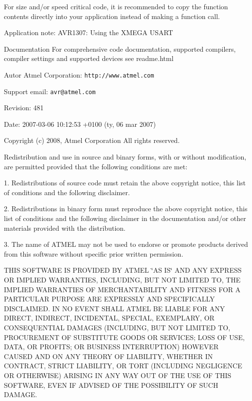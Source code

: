 For size and/or speed critical code, it is recommended to copy the function contents directly into your application instead of making a function call.

\begin{DoxyParagraph}{Application note:}
AVR1307: Using the XMEGA USART
\end{DoxyParagraph}
\begin{DoxyParagraph}{Documentation}
For comprehensive code documentation, supported compilers, compiler settings and supported devices see readme.html
\end{DoxyParagraph}
\begin{DoxyAuthor}{Autor}
Atmel Corporation: {\tt http://www.atmel.com} \par
 Support email: {\tt avr@atmel.com}
\end{DoxyAuthor}
\begin{DoxyParagraph}{Revision:}
481 
\end{DoxyParagraph}
\begin{DoxyParagraph}{Date:}
2007-\/03-\/06 10:12:53 +0100 (ty, 06 mar 2007) 
\end{DoxyParagraph}
\par


Copyright (c) 2008, Atmel Corporation All rights reserved.

Redistribution and use in source and binary forms, with or without modification, are permitted provided that the following conditions are met:

1. Redistributions of source code must retain the above copyright notice, this list of conditions and the following disclaimer.

2. Redistributions in binary form must reproduce the above copyright notice, this list of conditions and the following disclaimer in the documentation and/or other materials provided with the distribution.

3. The name of ATMEL may not be used to endorse or promote products derived from this software without specific prior written permission.

THIS SOFTWARE IS PROVIDED BY ATMEL \char`\"{}AS IS\char`\"{} AND ANY EXPRESS OR IMPLIED WARRANTIES, INCLUDING, BUT NOT LIMITED TO, THE IMPLIED WARRANTIES OF MERCHANTABILITY AND FITNESS FOR A PARTICULAR PURPOSE ARE EXPRESSLY AND SPECIFICALLY DISCLAIMED. IN NO EVENT SHALL ATMEL BE LIABLE FOR ANY DIRECT, INDIRECT, INCIDENTAL, SPECIAL, EXEMPLARY, OR CONSEQUENTIAL DAMAGES (INCLUDING, BUT NOT LIMITED TO, PROCUREMENT OF SUBSTITUTE GOODS OR SERVICES; LOSS OF USE, DATA, OR PROFITS; OR BUSINESS INTERRUPTION) HOWEVER CAUSED AND ON ANY THEORY OF LIABILITY, WHETHER IN CONTRACT, STRICT LIABILITY, OR TORT (INCLUDING NEGLIGENCE OR OTHERWISE) ARISING IN ANY WAY OUT OF THE USE OF THIS SOFTWARE, EVEN IF ADVISED OF THE POSSIBILITY OF SUCH DAMAGE. 

